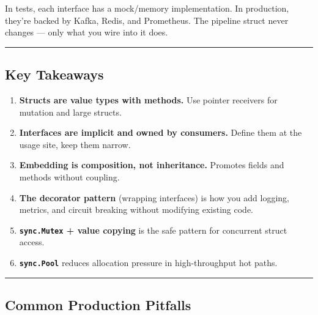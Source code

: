 \documentclass[11pt,openany]{book}
\providecommand{\tightlist}{%
  \setlength{\itemsep}{0pt}\setlength{\parskip}{0pt}}
\begin{document}
In tests, each interface has a mock/memory implementation. In
production, they're backed by Kafka, Redis, and Prometheus. The pipeline
struct never changes --- only what you wire into it does.

\begin{center}\rule{0.5\linewidth}{0.5pt}\end{center}

\hypertarget{key-takeaways-2}{%
\subsection{Key Takeaways}\label{key-takeaways-2}}

\begin{enumerate}
\def\labelenumi{\arabic{enumi}.}
\tightlist
\item
  \textbf{Structs are value types with methods.} Use pointer receivers
  for mutation and large structs.
\item
  \textbf{Interfaces are implicit and owned by consumers.} Define them
  at the usage site, keep them narrow.
\item
  \textbf{Embedding is composition, not inheritance.} Promotes fields
  and methods without coupling.
\item
  \textbf{The decorator pattern} (wrapping interfaces) is how you add
  logging, metrics, and circuit breaking without modifying existing
  code.
\item
  \textbf{\texttt{sync.Mutex} + value copying} is the safe pattern for
  concurrent struct access.
\item
  \textbf{\texttt{sync.Pool}} reduces allocation pressure in
  high-throughput hot paths.
\end{enumerate}

\begin{center}\rule{0.5\linewidth}{0.5pt}\end{center}

\hypertarget{common-production-pitfalls-2}{%
\subsection{Common Production
Pitfalls}\label{common-production-pitfalls-2}}
\end{document}

